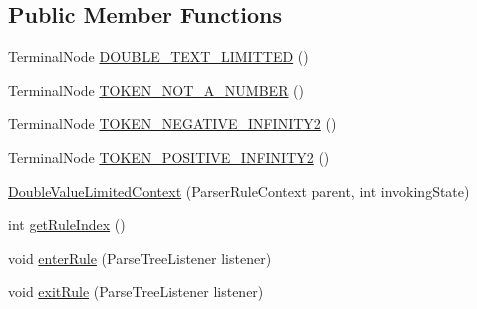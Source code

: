\subsection*{Public Member Functions}
\begin{DoxyCompactItemize}
\item 
Terminal\+Node \hyperlink{classgov_1_1nasa_1_1jpf_1_1inspector_1_1server_1_1expression_1_1parser_1_1_expression_grammar_pa747378014be7c4ab66961e5db1be8d25_a85da4c85ef492de79941f31738079c6b}{D\+O\+U\+B\+L\+E\+\_\+\+T\+E\+X\+T\+\_\+\+L\+I\+M\+I\+T\+T\+ED} ()
\item 
Terminal\+Node \hyperlink{classgov_1_1nasa_1_1jpf_1_1inspector_1_1server_1_1expression_1_1parser_1_1_expression_grammar_pa747378014be7c4ab66961e5db1be8d25_a9b9bfa57dcfacd07454fe14c5dd40c82}{T\+O\+K\+E\+N\+\_\+\+N\+O\+T\+\_\+\+A\+\_\+\+N\+U\+M\+B\+ER} ()
\item 
Terminal\+Node \hyperlink{classgov_1_1nasa_1_1jpf_1_1inspector_1_1server_1_1expression_1_1parser_1_1_expression_grammar_pa747378014be7c4ab66961e5db1be8d25_acdbb3a8b5ad84967fc01524e497bbaa3}{T\+O\+K\+E\+N\+\_\+\+N\+E\+G\+A\+T\+I\+V\+E\+\_\+\+I\+N\+F\+I\+N\+I\+T\+Y2} ()
\item 
Terminal\+Node \hyperlink{classgov_1_1nasa_1_1jpf_1_1inspector_1_1server_1_1expression_1_1parser_1_1_expression_grammar_pa747378014be7c4ab66961e5db1be8d25_af6f0647d012a9237968744f20a7f3f37}{T\+O\+K\+E\+N\+\_\+\+P\+O\+S\+I\+T\+I\+V\+E\+\_\+\+I\+N\+F\+I\+N\+I\+T\+Y2} ()
\item 
\hyperlink{classgov_1_1nasa_1_1jpf_1_1inspector_1_1server_1_1expression_1_1parser_1_1_expression_grammar_pa747378014be7c4ab66961e5db1be8d25_a85005191c6bdf1eae7832f6a27cf5acc}{Double\+Value\+Limited\+Context} (Parser\+Rule\+Context parent, int invoking\+State)
\item 
int \hyperlink{classgov_1_1nasa_1_1jpf_1_1inspector_1_1server_1_1expression_1_1parser_1_1_expression_grammar_pa747378014be7c4ab66961e5db1be8d25_ad50b799b2c81311afb210d4b11f82706}{get\+Rule\+Index} ()
\item 
void \hyperlink{classgov_1_1nasa_1_1jpf_1_1inspector_1_1server_1_1expression_1_1parser_1_1_expression_grammar_pa747378014be7c4ab66961e5db1be8d25_a832f8a7a72e8cc9941fce575d1db4445}{enter\+Rule} (Parse\+Tree\+Listener listener)
\item 
void \hyperlink{classgov_1_1nasa_1_1jpf_1_1inspector_1_1server_1_1expression_1_1parser_1_1_expression_grammar_pa747378014be7c4ab66961e5db1be8d25_a4af63caaa095e66481990024422ec019}{exit\+Rule} (Parse\+Tree\+Listener listener)
\end{DoxyCompactItemize}
